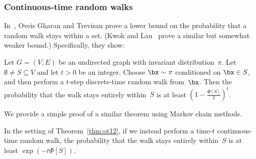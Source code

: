 \documentclass[11pt]{article}
\begin{document}
\subsubsection{Continuous-time random walks}
In~\cite{OT12}, Oveis Gharan and Trevisan prove a lower bound on the probability that a random walk stays within a set. (Kwok and Lau~\cite{KL12} prove a similar but somewhat weaker bound.)  Specifically, they show:
\begin{theorem} \label{thm:ot12}
    Let $G = (V,E)$ be an undirected graph with invariant distribution~$\pi$.  Let $\emptyset \neq S \subseteq V$ and let $t > 0$ be an integer.  Choose $\bx \sim \pi$ conditioned on $\bx \in S$, and then perform a $t$-step discrete-time random walk from~$\bx$.  Then the probability that the walk stays entirely within~$S$ is at least $\left(1-\frac{\Phi[S]}{2}\right)^t$.
\end{theorem}

We provide a simple proof of a similar theorem using Markov chain methods.

\begin{theorem}
\label{thm:cont_rand_walk}
In the setting of Theorem~\ref{thm:ot12}, if we instead perform a time-$t$ continuous-time random walk, the probability that the walk stays entirely within~$S$ is at least $\exp(-t\Phi[S])$.
\end{theorem}
\end{document}
